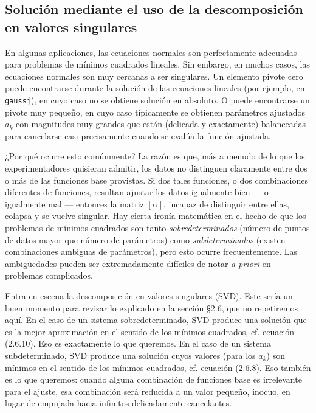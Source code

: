 \documentclass[10pt,a4paper]{book}
\begin{document}
\subsection{Solución mediante el uso de la descomposición en valores singulares}

En algunas aplicaciones, las ecuaciones normales son perfectamente adecuadas para problemas de mínimos cuadrados lineales. Sin embargo, en muchos casos, las ecuaciones normales son muy cercanas a ser singulares. Un elemento pivote cero puede encontrarse durante la solución de las ecuaciones lineales (por ejemplo, en \texttt{gaussj}), en cuyo caso no se obtiene solución en absoluto. O puede encontrarse un pivote muy pequeño, en cuyo caso típicamente se obtienen parámetros ajustados $a_k$ con magnitudes muy grandes que están (delicada y exactamente) balanceadas para cancelarse casi precisamente cuando se evalúa la función ajustada.

¿Por qué ocurre esto comúnmente? La razón es que, más a menudo de lo que los experimentadores quisieran admitir, los datos no distinguen claramente entre dos o más de las funciones base provistas. Si dos tales funciones, o dos combinaciones diferentes de funciones, resultan ajustar los datos igualmente bien — o igualmente mal — entonces la matriz $[\alpha]$, incapaz de distinguir entre ellas, colapsa y se vuelve singular. Hay cierta ironía matemática en el hecho de que los problemas de mínimos cuadrados son tanto \textit{sobredeterminados} (número de puntos de datos mayor que número de parámetros) como \textit{subdeterminados} (existen combinaciones ambiguas de parámetros), pero esto ocurre frecuentemente. Las ambigüedades pueden ser extremadamente difíciles de notar \textit{a priori} en problemas complicados.

Entra en escena la descomposición en valores singulares (SVD). Este sería un buen momento para revisar lo explicado en la sección §2.6, que no repetiremos aquí. En el caso de un sistema sobredeterminado, SVD produce una solución que es la mejor aproximación en el sentido de los mínimos cuadrados, cf. ecuación (2.6.10). Eso es exactamente lo que queremos. En el caso de un sistema subdeterminado, SVD produce una solución cuyos valores (para los $a_k$) son mínimos en el sentido de los mínimos cuadrados, cf. ecuación (2.6.8). Eso también es lo que queremos: cuando alguna combinación de funciones base es irrelevante para el ajuste, esa combinación será reducida a un valor pequeño, inocuo, en lugar de empujada hacia infinitos delicadamente cancelantes.
\end{document}
